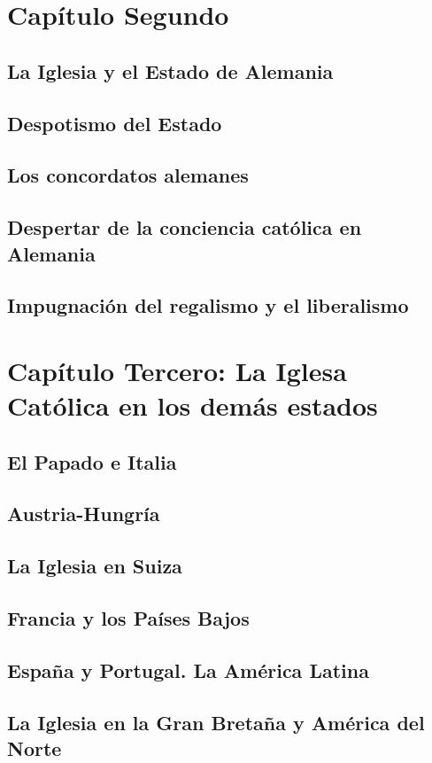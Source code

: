 \raggedbottom{} \documentclass[12pt, a4paper]{book}
\begin{document}
\chapter{Capítulo Segundo}
\section{La Iglesia y el Estado de Alemania}
\section{Despotismo del Estado}
\section{Los concordatos alemanes}
\section{Despertar de la conciencia católica en Alemania}
\section{Impugnación del regalismo y el liberalismo}
\chapter{Capítulo Tercero: La Iglesa Católica en los demás estados}
\section{El Papado e Italia}
\section{Austria-Hungría}
\section{La Iglesia en Suiza}
\section{Francia y los Países Bajos}
\section{España y Portugal. La América Latina}
\section{La Iglesia en la Gran Bretaña y América del Norte}
\end{document}
